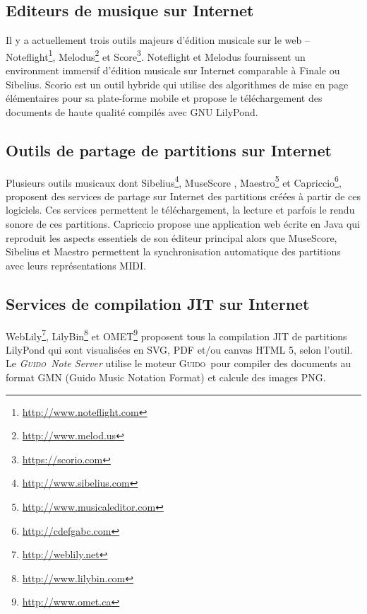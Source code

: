\documentclass{article}
\newcommand{\guido}		{\textsc{Guido}}
\begin{document}
\subsection{Editeurs de musique sur Internet}\label{subsection:editor}
Il y a actuellement trois outils majeurs d'édition musicale sur le web -- Noteflight\footnote{\url{http://www.noteflight.com}}, Melodus\footnote{\url{http://www.melod.us}} et Score\footnote{\url{https://scorio.com}}. Noteflight et Melodus fournissent un environment immersif d'édition musicale sur Internet comparable à Finale ou Sibelius. Scorio est un outil hybride qui utilise des algorithmes de mise en page élémentaires pour sa plate-forme mobile et propose le téléchargement des documents de haute qualité compilés avec GNU LilyPond.

\subsection{Outils de partage de partitions sur Internet}\label{subsection:sharing}
Plusieurs outils musicaux dont Sibelius\footnote{\url{http://www.sibelius.com}}, Muse\-Score \cite{musescore}, Maestro\footnote{\url{http://www.musicaleditor.com}} et Capriccio\footnote{\url{http://cdefgabc.com}}, proposent des services de partage sur Internet des partitions créées à partir de ces logiciels. Ces services permettent le téléchargement, la lecture et parfois le rendu sonore de ces partitions. Capriccio propose une application web écrite en Java qui reproduit les aspects essentiels de son éditeur principal alors que MuseScore, Sibelius et Maestro permettent la synchronisation automatique des partitions avec leurs représentations MIDI.

\subsection{Services de compilation JIT sur Internet}\label{subsection:jit}
WebLily\footnote{\url{http://weblily.net}}, LilyBin\footnote{\url{http://www.lilybin.com}} et OMET\footnote{\url{http://www.omet.ca}} proposent tous la compilation JIT de partitions LilyPond qui sont visualisées en SVG, PDF et/ou canvas HTML 5, selon l'outil. Le \emph{\guido\ Note Server} \cite{renz98} utilise le moteur \guido\ pour compiler des documents au format GMN (Guido Music Notation Format) \cite{hoos98} et calcule des images PNG.
\end{document}
